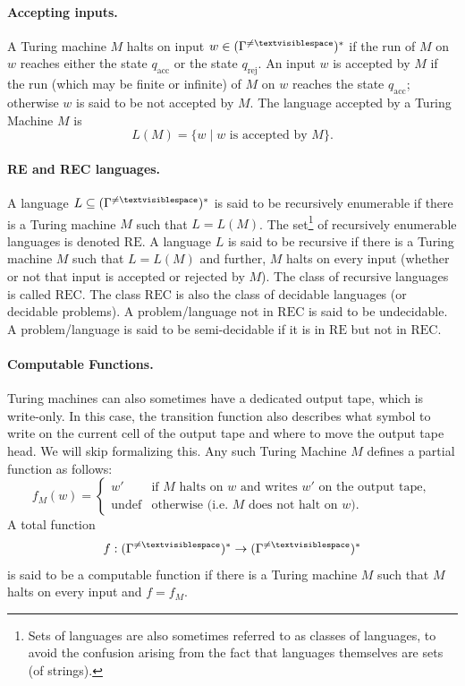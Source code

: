 \documentclass{article}
\begin{document}
\paragraph{Accepting inputs.}
A Turing machine $M$ halts on input $w \in (\Gamma^{\neq \textvisiblespace})^*$ if the run of $M$ on $w$ reaches either the state $q_{\mathrm{acc}}$ or the state $q_{\mathrm{rej}}$. An input $w$ is accepted by $M$ if the run (which may be finite or infinite) of $M$ on $w$ reaches the state $q_{\mathrm{acc}}$; otherwise $w$ is said to be not accepted by $M$. The language accepted by a Turing Machine $M$ is
\[
L(M)=\{w \mid w \text{ is accepted by } M\}.
\]

\paragraph{RE and REC languages.}
A language $L \subseteq (\Gamma^{\neq \textvisiblespace})^*$ is said to be recursively enumerable if there is a Turing machine $M$ such that $L=L(M)$. The set\footnote{Sets of languages are also sometimes referred to as classes of languages, to avoid the confusion arising from the fact that languages themselves are sets (of strings).} of recursively enumerable languages is denoted $\mathrm{RE}$. A language $L$ is said to be recursive if there is a Turing machine $M$ such that $L=L(M)$ and further, $M$ halts on every input (whether or not that input is accepted or rejected by $M$). The class of recursive languages is called $\mathrm{REC}$. The class $\mathrm{REC}$ is also the class of decidable languages (or decidable problems). A problem/language not in $\mathrm{REC}$ is said to be undecidable. A problem/language is said to be semi-decidable if it is in $\mathrm{RE}$ but not in $\mathrm{REC}$.

\paragraph{Computable Functions.}
Turing machines can also sometimes have a dedicated output tape, which is write-only. In this case, the transition function also describes what symbol to write on the current cell of the output tape and where to move the output tape head. We will skip formalizing this. Any such Turing Machine $M$ defines a partial function as follows:
\[
f_M(w)=
\begin{cases}
w' & \text{if $M$ halts on $w$ and writes $w'$ on the output tape},\\
\mathrm{undef} & \text{otherwise (i.e.\ $M$ does not halt on $w$).}
\end{cases}
\]
A total function
\[
f : (\Gamma^{\neq \textvisiblespace})^* \to (\Gamma^{\neq \textvisiblespace})^*
\]
is said to be a computable function if there is a Turing machine $M$ such that $M$ halts on every input and $f=f_M$.
\end{document}
